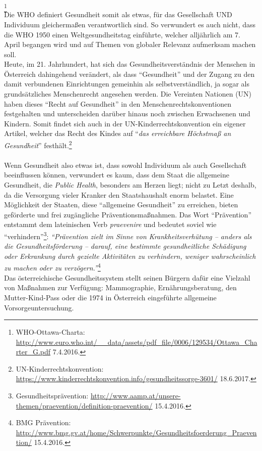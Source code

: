 \documentclass[
    a4paper,
    12pt,
    hyphens,
    chapterprefix=true,
    headheight=33pt,
    footheight=29pt,
    headings=optiontohead,
]{scrartcl}
\begin{document}
\footnote{WHO-Ottawa-Charta: \url{http://www.euro.who.int/__data/assets/pdf_file/0006/129534/Ottawa_Charter_G.pdf} 7.4.2016.}\\
Die WHO definiert Gesundheit somit als etwas, für das Gesellschaft UND Individuum gleichermaßen verantwortlich sind. So verwundert es auch nicht, dass die WHO 1950 einen Weltgesundheitstag einführte, welcher alljährlich am 7. April begangen wird und auf Themen von globaler Relevanz aufmerksam machen soll.\\
Heute, im 21. Jahrhundert, hat sich das Gesundheitsverständnis der Menschen in Österreich dahingehend verändert, als dass "`Gesundheit"' und der Zugang zu den damit verbundenen Einrichtungen gemeinhin als selbstverständlich, ja sogar als grundsätzliches Menschenrecht angesehen werden. Die Vereinten Nationen (UN) haben dieses "`Recht auf Gesundheit"' in den Menschenrechtskonventionen festgehalten und unterscheiden darüber hinaus noch zwischen Erwachsenen und Kindern. Somit findet sich auch in der UN-Kinderrechtskonvention ein eigener Artikel, welcher das Recht des Kindes auf "`\textit{das erreichbare Höchstmaß an Gesundheit}"' festhält.\footnote{UN-Kinderrechtskonvention: \url{https://www.kinderrechtskonvention.info/gesundheitssorge-3601/} 18.6.2017.}\\
\\
Wenn Gesundheit also etwas ist, dass sowohl Individuum als auch Gesellschaft beeinflussen können, verwundert es kaum, dass dem Staat die allgemeine Gesundheit, die \textit{Public Health}, besonders am Herzen liegt; nicht zu Letzt deshalb, da die Versorgung vieler Kranker den Staatshaushalt enorm belastet. Eine Möglichkeit der Staaten, diese "`allgemeine Gesundheit"' zu erreichen, bieten geförderte und frei zugängliche Präventionsmaßnahmen. Das Wort "`Prävention"' entstammt dem lateinischen Verb \textit{praevenire} und bedeutet soviel wie "`verhindern"'\footnote{Gesundheitsprävention: \url{http://www.aamp.at/unsere-themen/praevention/definition-praevention/} 15.4.2016.}: \textit{"`Prävention zielt im Sinne von Krankheitsverhütung
-- anders als die Gesundheitsförderung -- darauf, eine bestimmte gesundheitliche Schädigung oder Erkrankung durch gezielte Aktivitäten zu verhindern, weniger wahrscheinlich zu machen oder zu verzögern."'}\footnote{BMG Prävention: \url{http://www.bmg.gv.at/home/Schwerpunkte/Gesundheitsfoerderung\_Praevention/} 15.4.2016.}\\
Das österreichische Gesundheitssystem stellt seinen Bürgern dafür eine Vielzahl von Maßnahmen zur Verfügung: Mammographie, Ernährungsberatung, den Mutter-Kind-Pass oder die 1974 in Österreich eingeführte allgemeine Vorsorgeuntersuchung.\\
\end{document}
